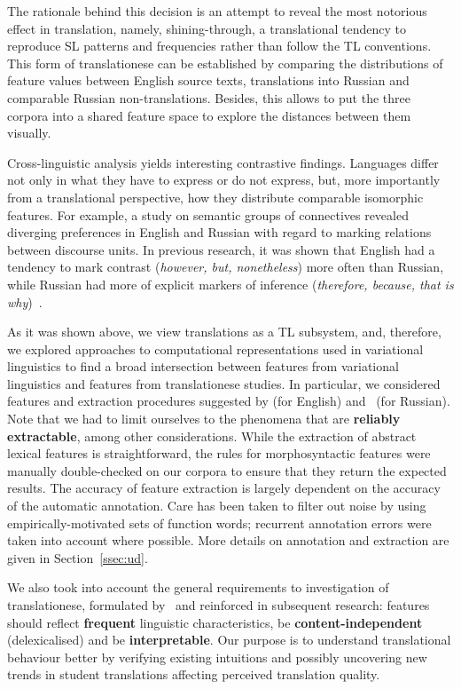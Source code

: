 The rationale behind this decision is an attempt to reveal the most notorious effect in translation, namely, shining-through, a translational tendency to reproduce SL patterns and frequencies rather than follow the TL conventions. This form of translationese can be established by comparing the distributions of feature values between English source texts, translations into Russian and comparable Russian non-translations. Besides, this allows to put the three corpora into a shared feature space to explore the  distances between them visually.

Cross-linguistic analysis yields interesting contrastive findings. Languages differ not only in what they have to express or do not express, but, more importantly from a translational perspective, how they distribute comparable isomorphic features. For example, a study on semantic groups of connectives revealed diverging preferences in English and Russian with regard to marking relations between discourse units. 
In previous research, it was shown that English had a tendency to mark contrast (\textit{however, but, nonetheless}) more often than Russian, while Russian had more of explicit markers of inference (\textit{therefore, because, that is why})~\cite{Kunilovskaya2017conn}.   

As it was shown above, we view translations as a TL subsystem, and, therefore, we explored approaches to computational representations used in variational linguistics to find a broad intersection between features from variational linguistics and features from translationese studies. 
In particular, we considered features and extraction procedures suggested by \citet{Biber1995,Nini2015} (for English) and~\citet{Katinskaya2015} (for Russian). Note that we had to limit ourselves to the phenomena that are \textbf{reliably extractable}, among other considerations. While the extraction of abstract lexical features is straightforward, the rules for morphosyntactic features were manually double-checked on our corpora to ensure that they return the expected results. The accuracy of feature extraction is largely dependent on the accuracy of the automatic annotation. Care has been taken to filter out noise by using empirically-motivated sets of function words; recurrent annotation errors were taken into account where possible. More details on annotation and extraction are given in Section~\ref{ssec:ud}.

We also took into account the general requirements to investigation of translationese, formulated by~\citet{Volansky2015} and reinforced in subsequent research: features should reflect \textbf{frequent} linguistic characteristics, be \textbf{content-independent} (delexicalised) and be \textbf{interpretable}. Our purpose is to understand translational behaviour better by verifying existing intuitions and possibly uncovering new trends in student translations affecting perceived translation quality. 

